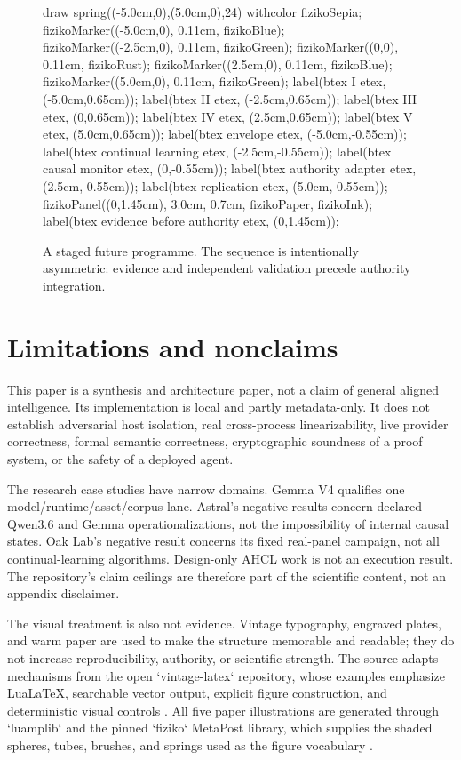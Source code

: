 \documentclass[11pt,twoside]{article}
\newcommand{\sourcecite}[1]{\parencite{#1}}
\begin{document}
\begin{figure}[!ht]
\centering
\mpfig
  draw spring((-5.0cm,0),(5.0cm,0),24) withcolor fizikoSepia;
  fizikoMarker((-5.0cm,0), 0.11cm, fizikoBlue);
  fizikoMarker((-2.5cm,0), 0.11cm, fizikoGreen);
  fizikoMarker((0,0), 0.11cm, fizikoRust);
  fizikoMarker((2.5cm,0), 0.11cm, fizikoBlue);
  fizikoMarker((5.0cm,0), 0.11cm, fizikoGreen);
  label(btex \large I etex, (-5.0cm,0.65cm));
  label(btex \large II etex, (-2.5cm,0.65cm));
  label(btex \large III etex, (0,0.65cm));
  label(btex \large IV etex, (2.5cm,0.65cm));
  label(btex \large V etex, (5.0cm,0.65cm));
  label(btex \scriptsize envelope etex, (-5.0cm,-0.55cm));
  label(btex \scriptsize continual learning etex, (-2.5cm,-0.55cm));
  label(btex \scriptsize causal monitor etex, (0,-0.55cm));
  label(btex \scriptsize authority adapter etex, (2.5cm,-0.55cm));
  label(btex \scriptsize replication etex, (5.0cm,-0.55cm));
  fizikoPanel((0,1.45cm), 3.0cm, 0.7cm, fizikoPaper, fizikoInk);
  label(btex \scriptsize evidence before authority etex, (0,1.45cm));
\endmpfig
\caption{A staged future programme. The sequence is intentionally asymmetric: evidence and independent validation precede authority integration.}
\label{fig:roadmap}
\end{figure}

\section{Limitations and nonclaims}

  This paper is a synthesis and architecture paper, not a claim of general aligned intelligence. Its implementation is local and partly metadata-only. It does not establish adversarial host isolation, real cross-process linearizability, live provider correctness, formal semantic correctness, cryptographic soundness of a proof system, or the safety of a deployed agent.

  The research case studies have narrow domains. Gemma V4 qualifies one model/runtime/asset/corpus lane. Astral's negative results concern declared Qwen3.6 and Gemma operationalizations, not the impossibility of internal causal states. Oak Lab's negative result concerns its fixed real-panel campaign, not all continual-learning algorithms. Design-only AHCL work is not an execution result. The repository's claim ceilings are therefore part of the scientific content, not an appendix disclaimer.

  The visual treatment is also not evidence. Vintage typography, engraved plates, and warm paper are used to make the structure memorable and readable; they do not increase reproducibility, authority, or scientific strength. The source adapts mechanisms from the open `vintage-latex` repository, whose examples emphasize LuaLaTeX, searchable vector output, explicit figure construction, and deterministic visual controls \sourcecite{vintagelatex2026}. All five paper illustrations are generated through `luamplib` and the pinned `fiziko` MetaPost library, which supplies the shaded spheres, tubes, brushes, and springs used as the figure vocabulary \sourcecite{fiziko2023}.
\end{document}

